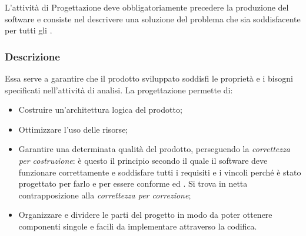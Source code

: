 \documentclass[../NomeDocumento.tex]{subfiles}
\begin{document}
	L'attività di Progettazione deve obbligatoriamente precedere la produzione del software e consiste nel descrivere una soluzione del problema che sia soddisfacente per tutti gli .
	
	\subsubsection{Descrizione}
	
	Essa serve a garantire che il prodotto sviluppato soddisfi le proprietà e i bisogni specificati nell'attività di analisi. La progettazione permette di:
	
	\begin{itemize}
		\item Costruire un’architettura logica del prodotto;
		\item Ottimizzare l’uso delle risorse;
		\item Garantire una determinata qualità del prodotto, perseguendo la \textit{correttezza per costruzione}: è questo il principio secondo il quale il software deve funzionare correttamente e soddisfare tutti i requisiti e i vincoli perché è stato progettato per farlo e per essere conforme ed . Si trova in netta contrapposizione alla \textit{correttezza per
		correzione};
		\item Organizzare e dividere le parti del progetto in modo da poter ottenere componenti singole e facili da implementare attraverso la codifica. 
	\end{itemize}
\end{document}
